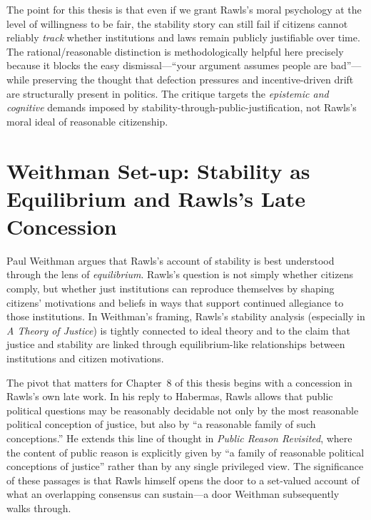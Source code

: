 \documentclass[12pt]{report}
\begin{document}
The point for this thesis is that even if we grant Rawls's moral psychology at the level of willingness to be fair, the stability story can still fail if citizens cannot reliably \emph{track} whether institutions and laws remain publicly justifiable over time. The rational/reasonable distinction is methodologically helpful here precisely because it blocks the easy dismissal---``your argument assumes people are bad''---while preserving the thought that defection pressures and incentive-driven drift are structurally present in politics. The critique targets the \emph{epistemic and cognitive} demands imposed by stability-through-public-justification, not Rawls's moral ideal of reasonable citizenship.

\section{Weithman Set-up: Stability as Equilibrium and Rawls's Late Concession}
Paul Weithman argues that Rawls's account of stability is best understood through the lens of \emph{equilibrium}. Rawls's question is not simply whether citizens comply, but whether just institutions can reproduce themselves by shaping citizens' motivations and beliefs in ways that support continued allegiance to those institutions. In Weithman's framing, Rawls's stability analysis (especially in \emph{A Theory of Justice}) is tightly connected to ideal theory and to the claim that justice and stability are linked through equilibrium-like relationships between institutions and citizen motivations.\parencite[p.~1188]{Weithman2024Rescuing}

The pivot that matters for Chapter~8 of this thesis begins with a concession in Rawls's own late work. In his reply to Habermas, Rawls allows that public political questions may be reasonably decidable not only by the most reasonable political conception of justice, but also by ``a reasonable family of such conceptions.''\parencite[p.~147]{rawls1995reply} He extends this line of thought in \emph{Public Reason Revisited}, where the content of public reason is explicitly given by ``a family of reasonable political conceptions of justice'' rather than by any single privileged view.\parencite[pp.~775--776]{rawls1997public} The significance of these passages is that Rawls himself opens the door to a set-valued account of what an overlapping consensus can sustain---a door Weithman subsequently walks through.
\end{document}
